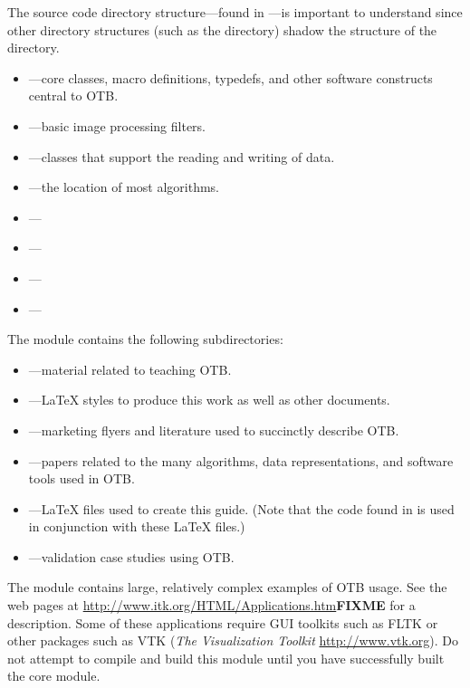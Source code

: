 The source code directory structure---found in ---is 
important to understand since other directory structures (such as the
 directory) shadow the structure of the
 directory.
\begin{itemize}
        \item {}---core classes, macro definitions,
        typedefs, and other software constructs central to OTB.
        \item {}---basic image processing
        filters.
        \item {}---classes that support the reading
        and writing of data.
        \item {}---the location of most
        algorithms.
	\item {}---
	\item {}---
	\item {}---
	\item {}---
	  
\end{itemize}

The  module contains the following subdirectories:
\begin{itemize}
        \item {}---material related to
        teaching OTB.
        \item {}---\LaTeX{} styles to produce this
        work as well as other documents.
        \item {}---marketing flyers and 
        literature used to succinctly describe OTB.
        \item {}---papers related to the many
        algorithms, data representations, and software tools used in OTB.
        \item {}---\LaTeX{} files used to
        create this guide. (Note that the code found in
         is used in conjunction with these \LaTeX{}
        files.)
        \item {}---validation case studies
        using OTB.
\end{itemize}

The  module contains large, relatively complex
examples of OTB usage. See the web pages at 
\url{http://www.itk.org/HTML/Applications.htm}\textbf{FIXME} for a description. Some of 
these applications require GUI toolkits such as FLTK or other packages
such as VTK (\emph{The Visualization Toolkit}
\url{http://www.vtk.org}). Do not attempt to compile and build this module
until you have successfully built the core  module.


